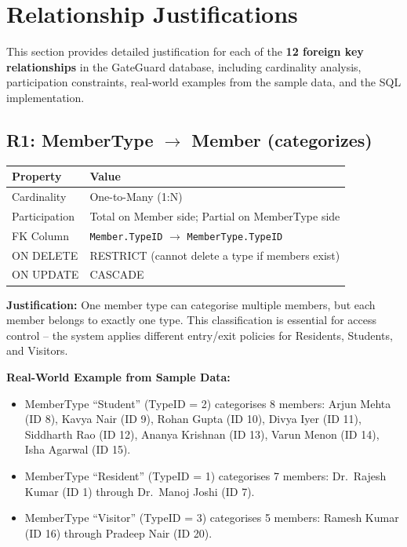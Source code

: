 \documentclass[a4paper, 12pt]{article}
\begin{document}
\newpage
\section{Relationship Justifications}
\label{sec:relationships}

This section provides detailed justification for each of the \textbf{12 foreign key relationships} in the GateGuard database, including cardinality analysis, participation constraints, real-world examples from the sample data, and the SQL implementation.

\subsection{R1: MemberType \texorpdfstring{$\rightarrow$}{->} Member (categorizes)}

\begin{table}[H]
\centering
\small
\begin{tabularx}{\textwidth}{l X}
\toprule
\textbf{Property} & \textbf{Value} \\
\midrule
Cardinality & One-to-Many (1:N) \\
Participation & Total on Member side; Partial on MemberType side \\
FK Column & \texttt{Member.TypeID} $\rightarrow$ \texttt{MemberType.TypeID} \\
ON DELETE & RESTRICT (cannot delete a type if members exist) \\
ON UPDATE & CASCADE \\
\bottomrule
\end{tabularx}
\end{table}

\textbf{Justification:} One member type can categorise multiple members, but each member belongs to exactly one type. This classification is essential for access control -- the system applies different entry/exit policies for Residents, Students, and Visitors.

\textbf{Real-World Example from Sample Data:}
\begin{itemize}[leftmargin=*, nosep]
    \item MemberType ``Student'' (TypeID = 2) categorises 8 members: Arjun Mehta (ID 8), Kavya Nair (ID 9), Rohan Gupta (ID 10), Divya Iyer (ID 11), Siddharth Rao (ID 12), Ananya Krishnan (ID 13), Varun Menon (ID 14), Isha Agarwal (ID 15).
    \item MemberType ``Resident'' (TypeID = 1) categorises 7 members: Dr.\ Rajesh Kumar (ID 1) through Dr.\ Manoj Joshi (ID 7).
    \item MemberType ``Visitor'' (TypeID = 3) categorises 5 members: Ramesh Kumar (ID 16) through Pradeep Nair (ID 20).
\end{itemize}
\end{document}
